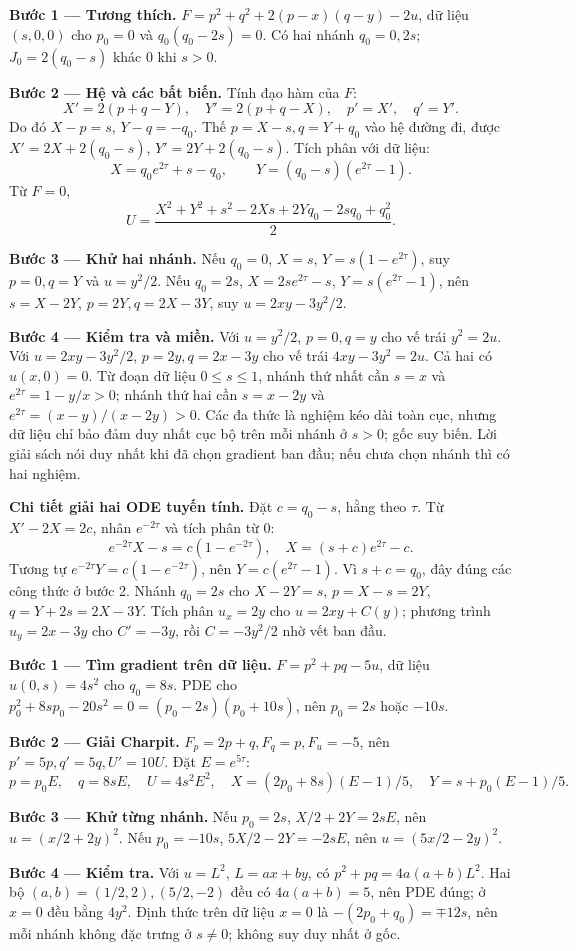 \textbf{Bước 1 — Tương thích.} $F=p^2+q^2+2(p-x)(q-y)-2u$, dữ liệu $(s,0,0)$ cho $p_0=0$ và $q_0(q_0-2s)=0$. Có hai nhánh $q_0=0,2s$; $J_0=2(q_0-s)$ khác 0 khi $s>0$.

\textbf{Bước 2 — Hệ và các bất biến.} Tính đạo hàm của $F$:
\[X'=2(p+q-Y),\quad Y'=2(p+q-X),\quad p'=X',\quad q'=Y'.\]
Do đó $X-p=s$, $Y-q=-q_0$. Thế $p=X-s,q=Y+q_0$ vào hệ đường đi, được $X'=2X+2(q_0-s)$, $Y'=2Y+2(q_0-s)$. Tích phân với dữ liệu:
\[X=q_0e^{2\tau}+s-q_0,\qquad Y=(q_0-s)(e^{2\tau}-1).\]
Từ $F=0$,
\[U=\frac{X^2+Y^2+s^2-2Xs+2Yq_0-2sq_0+q_0^2}{2}.\]

\textbf{Bước 3 — Khử hai nhánh.} Nếu $q_0=0$, $X=s$, $Y=s(1-e^{2\tau})$, suy $p=0,q=Y$ và $u=y^2/2$. Nếu $q_0=2s$, $X=2se^{2\tau}-s$, $Y=s(e^{2\tau}-1)$, nên $s=X-2Y$, $p=2Y,q=2X-3Y$, suy $u=2xy-3y^2/2$.

\textbf{Bước 4 — Kiểm tra và miền.} Với $u=y^2/2$, $p=0,q=y$ cho vế trái $y^2=2u$. Với $u=2xy-3y^2/2$, $p=2y,q=2x-3y$ cho vế trái $4xy-3y^2=2u$. Cả hai có $u(x,0)=0$. Từ đoạn dữ liệu $0\le s\le1$, nhánh thứ nhất cần $s=x$ và $e^{2\tau}=1-y/x>0$; nhánh thứ hai cần $s=x-2y$ và $e^{2\tau}=(x-y)/(x-2y)>0$. Các đa thức là nghiệm kéo dài toàn cục, nhưng dữ liệu chỉ bảo đảm duy nhất cục bộ trên mỗi nhánh ở $s>0$; gốc suy biến. Lời giải sách nói duy nhất khi đã chọn gradient ban đầu; nếu chưa chọn nhánh thì có hai nghiệm.

\textbf{Chi tiết giải hai ODE tuyến tính.} Đặt $c=q_0-s$, hằng theo $\tau$. Từ $X'-2X=2c$, nhân $e^{-2\tau}$ và tích phân từ $0$:
\[e^{-2\tau}X-s=c(1-e^{-2\tau}),\quad X=(s+c)e^{2\tau}-c.\]
Tương tự $e^{-2\tau}Y=c(1-e^{-2\tau})$, nên $Y=c(e^{2\tau}-1)$. Vì $s+c=q_0$, đây đúng các công thức ở bước 2. Nhánh $q_0=2s$ cho $X-2Y=s$, $p=X-s=2Y$, $q=Y+2s=2X-3Y$. Tích phân $u_x=2y$ cho $u=2xy+C(y)$; phương trình $u_y=2x-3y$ cho $C'=-3y$, rồi $C=-3y^2/2$ nhờ vết ban đầu.

\textbf{Bước 1 — Tìm gradient trên dữ liệu.} $F=p^2+pq-5u$, dữ liệu $u(0,s)=4s^2$ cho $q_0=8s$. PDE cho $p_0^2+8sp_0-20s^2=0=(p_0-2s)(p_0+10s)$, nên $p_0=2s$ hoặc $-10s$.

\textbf{Bước 2 — Giải Charpit.} $F_p=2p+q,F_q=p,F_u=-5$, nên $p'=5p,q'=5q,U'=10U$. Đặt $E=e^{5\tau}$:
\[p=p_0E,\quad q=8sE,\quad U=4s^2E^2,\quad X=(2p_0+8s)(E-1)/5,\quad Y=s+p_0(E-1)/5.\]

\textbf{Bước 3 — Khử từng nhánh.} Nếu $p_0=2s$, $X/2+2Y=2sE$, nên $u=(x/2+2y)^2$. Nếu $p_0=-10s$, $5X/2-2Y=-2sE$, nên $u=(5x/2-2y)^2$.

\textbf{Bước 4 — Kiểm tra.} Với $u=L^2$, $L=ax+by$, có $p^2+pq=4a(a+b)L^2$. Hai bộ $(a,b)=(1/2,2),(5/2,-2)$ đều có $4a(a+b)=5$, nên PDE đúng; ở $x=0$ đều bằng $4y^2$. Định thức trên dữ liệu $x=0$ là $-(2p_0+q_0)=\mp12s$, nên mỗi nhánh không đặc trưng ở $s\ne0$; không suy duy nhất ở gốc.

